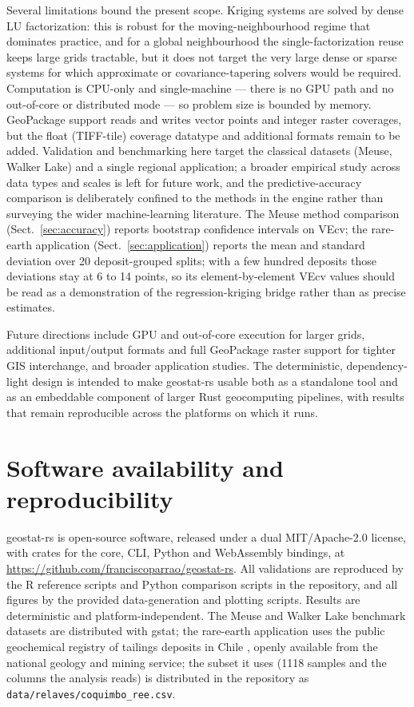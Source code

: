 \documentclass[preprint,12pt,authoryear]{elsarticle}
\begin{document}
Several limitations bound the present scope. Kriging systems are solved by dense
LU factorization: this is robust for the moving-neighbourhood regime that
dominates practice, and for a global neighbourhood the single-factorization
reuse keeps large grids tractable, but it does not target the very large dense
or sparse systems for which approximate or covariance-tapering solvers would be
required. Computation is CPU-only and single-machine --- there is no GPU path
and no out-of-core or distributed mode --- so problem size is bounded by memory.
GeoPackage support reads and writes vector points and integer raster coverages,
but the float (TIFF-tile) coverage datatype and additional formats remain to be
added.
Validation and benchmarking here target the classical datasets (Meuse, Walker
Lake) and a single regional application; a broader empirical study across data
types and scales is left for future work, and the predictive-accuracy
comparison is deliberately confined to the methods in the engine rather than
surveying the wider machine-learning literature. The Meuse method comparison
(Sect.~\ref{sec:accuracy}) reports bootstrap confidence intervals on VEcv; the
rare-earth application (Sect.~\ref{sec:application}) reports the mean and
standard deviation over 20 deposit-grouped splits; with a few hundred
deposits those deviations stay at 6 to 14 points, so its
element-by-element VEcv values should be read as a demonstration of the
regression-kriging bridge rather than as precise estimates.

Future directions include GPU and out-of-core execution for larger grids,
additional input/output formats and full GeoPackage raster support for tighter
GIS interchange, and broader application studies. The deterministic,
dependency-light design is intended to make geostat-rs usable both as a
standalone tool and as an embeddable component of larger Rust geocomputing
pipelines, with results that remain reproducible across the platforms on which
it runs.

\section{Software availability and reproducibility}
\label{sec:availability}

geostat-rs is open-source software, released under a dual MIT/Apache-2.0
license, with crates for the core, CLI, Python and WebAssembly bindings, at
\url{https://github.com/franciscoparrao/geostat-rs}. All validations are
reproduced by the R reference scripts and Python comparison scripts in the
repository, and all figures by the provided data-generation and plotting
scripts. Results are deterministic and platform-independent. The Meuse and
Walker Lake benchmark datasets are distributed with \textsf{gstat}; the
rare-earth application uses the public geochemical registry of tailings
deposits in Chile \citep{sernageomin2023}, openly available from the national geology and mining service; the subset it uses (1118 samples and the columns the analysis reads) is distributed in the repository as \texttt{data/relaves/coquimbo\_ree.csv}.



\end{document}
